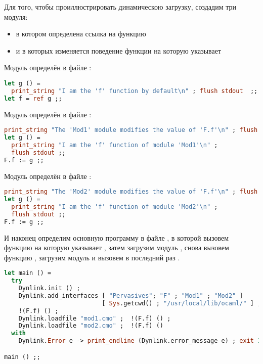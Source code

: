 Для того, чтобы проиллюстрировать динамическою загрузку, создадим три модуля:

\begin{itemize}
	\item {} в котором определена ссылка на функцию 

	\item {} и  в которых изменяется поведение функции на 
которую указывает 
\end{itemize}

Модуль  определён в файле :

\begin{lstlisting}[language=OCaml]
let g () = 
  print_string "I am the 'f' function by default\n" ; flush stdout  ;;
let f = ref g ;;
\end{lstlisting}

Модуль  определён в файле :

\begin{lstlisting}[language=OCaml]
print_string "The 'Mod1' module modifies the value of 'F.f'\n" ; flush stdout ;;
let g () = 
  print_string "I am the 'f' function of module 'Mod1'\n" ;
  flush stdout ;;
F.f := g ;;
\end{lstlisting}

Модуль  определён в файле :

\begin{lstlisting}[language=OCaml]
print_string "The 'Mod2' module modifies the value of 'F.f'\n" ; flush stdout ;;
let g () = 
  print_string "I am the 'f' function of module 'Mod2'\n" ;
  flush stdout ;;
F.f := g ;;
\end{lstlisting}

И наконец определим основную программу в файле , в которой 
вызовем функцию на которую указывает , затем загрузим модуль 
, снова вызовем функцию , загрузим модуль  и 
вызовем в последний раз .

\begin{lstlisting}[language=OCaml]
let main () = 
  try 
    Dynlink.init () ;
    Dynlink.add_interfaces [ "Pervasives"; "F" ; "Mod1" ; "Mod2" ] 
                           [ Sys.getcwd() ; "/usr/local/lib/ocaml/" ] ;
    !(F.f) () ;
    Dynlink.loadfile "mod1.cmo" ;  !(F.f) () ;
    Dynlink.loadfile "mod2.cmo" ;  !(F.f) () 
  with 
    Dynlink.Error e -> print_endline (Dynlink.error_message e) ; exit 1 ;;

main () ;;
\end{lstlisting}

